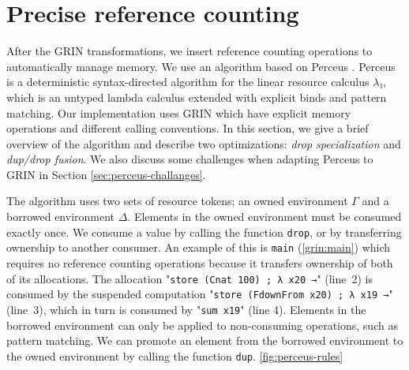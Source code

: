 \documentclass[9pt, twocolumn]{article}
\newcommand{\refp}[1]{(\ref{#1})}
\begin{document}
\section{Precise reference counting}
\label{sec:precise}
After the GRIN transformations, we insert reference counting operations to automatically manage memory.
We use an algorithm based on Perceus \citep{reinking2021}. 
Perceus is a deterministic syntax-directed algorithm for the linear resource calculus $λ₁$, which is an untyped lambda calculus extended with explicit binds and pattern matching.
Our implementation uses GRIN which have explicit memory operations and different calling conventions.
In this section, we give a brief overview of the algorithm and describe two optimizations: \emph{drop specialization} and \emph{dup/drop fusion}.
We also discuss some challenges when adapting Perceus to GRIN in Section \ref{sec:perceus-challanges}. 


The algorithm uses two sets of resource tokens; an owned environment $\Gamma$ and a borrowed environment $\Delta$. 
Elements in the owned environment must be consumed exactly once. 
We consume a value by calling the function \lstinline{drop}, or by transferring ownership to another consumer.
An example of this is \lstinline{main} \refp{grin:main} which requires no reference counting operations because it transfers ownership of both of its allocations.
The allocation "\lstinline{store (Cnat 100) ; λ x20 →}" \mbox{(line 2)} is consumed by the suspended computation "\lstinline{store (FdownFrom x20) ; λ x19 →}" \mbox{(line 3)}, which in turn is consumed by "\lstinline{sum x19}" (line 4).
Elements in the borrowed environment can only be applied to non-consuming operations, such as pattern matching. 
We can promote an element from the borrowed environment to the owned environment by calling the function \lstinline{dup}.
\ref{fig:perceus-rules}
\end{document}
